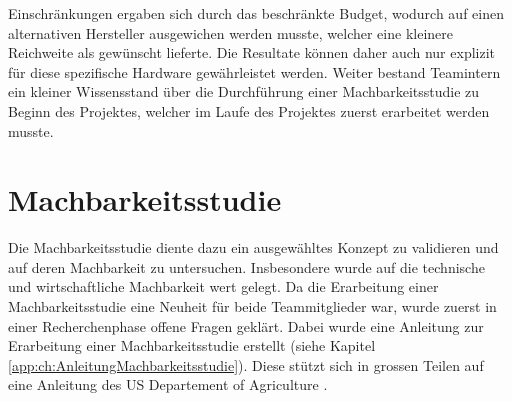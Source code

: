 Einschränkungen ergaben sich durch das beschränkte Budget, wodurch auf einen alternativen Hersteller ausgewichen werden musste, welcher eine kleinere Reichweite als gewünscht lieferte. Die Resultate können daher auch nur explizit für diese spezifische Hardware gewährleistet werden.
Weiter bestand Teamintern ein kleiner Wissensstand über die Durchführung einer Machbarkeitsstudie zu Beginn des Projektes, welcher im Laufe des Projektes zuerst erarbeitet werden musste.

\section{Machbarkeitsstudie}
Die Machbarkeitsstudie diente dazu ein ausgewähltes Konzept zu validieren und auf deren Machbarkeit zu untersuchen. Insbesondere wurde auf die technische und wirtschaftliche Machbarkeit wert gelegt. Da die Erarbeitung einer Machbarkeitsstudie eine Neuheit für beide Teammitglieder war, wurde zuerst in einer Recherchenphase offene Fragen geklärt. Dabei wurde eine Anleitung zur Erarbeitung einer Machbarkeitsstudie erstellt (siehe Kapitel \ref{app:ch:AnleitungMachbarkeitsstudie}). Diese stützt sich in grossen Teilen auf eine Anleitung des US Departement of Agriculture \parencite{Matson2000}.
